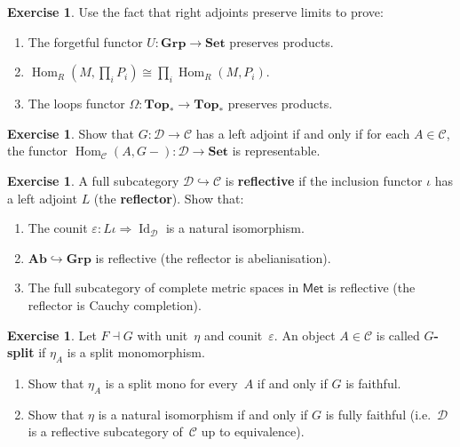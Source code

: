 \documentclass[a4paper,12pt]{book}
\DeclareMathOperator{\Hom}{Hom}
\DeclareMathOperator{\Id}{Id}
\newcommand{\Set}{\mathbf{Set}}
\newcommand{\Grp}{\mathbf{Grp}}
\newcommand{\Ab}{\mathbf{Ab}}
\newcommand{\Top}{\mathbf{Top}}
\theoremstyle{definition}
\newtheorem{exercise}[definition]{Exercise}
\theoremstyle{plain}
\theoremstyle{remark}
\begin{document}
\begin{exercise}\label{exer:radj-preserves-lim-examples}
Use the fact that right adjoints preserve limits to prove:
\begin{enumerate}[label=(\alph*)]
\item The forgetful functor $U\colon\Grp\to\Set$ preserves products.
\item $\Hom_R(M,\prod_i P_i)\cong\prod_i\Hom_R(M,P_i)$.
\item The loops functor $\Omega\colon\Top_*\to\Top_*$ preserves products.
\end{enumerate}
\end{exercise}

\begin{exercise}\label{exer:adj-iff-representable}
Show that $G\colon\mathcal{D}\to\mathcal{C}$ has a left adjoint
if and only if for each $A\in\mathcal{C}$, the functor
$\Hom_\mathcal{C}(A,G-)\colon\mathcal{D}\to\Set$ is representable.
\end{exercise}

\begin{exercise}\label{exer:reflective-subcategory}
A full subcategory $\mathcal{D}\hookrightarrow\mathcal{C}$ is
\textbf{reflective} if the inclusion functor $\iota$ has a left adjoint
$L$ (the \textbf{reflector}).  Show that:
\begin{enumerate}[label=(\alph*)]
\item The counit $\varepsilon\colon L\iota\Rightarrow\Id_\mathcal{D}$
    is a natural isomorphism.
\item $\Ab\hookrightarrow\Grp$ is reflective (the reflector is abelianisation).
\item The full subcategory of complete metric spaces in $\mathsf{Met}$
    is reflective (the reflector is Cauchy completion).
\end{enumerate}
\end{exercise}

\begin{exercise}\label{exer:fixed-points-adjunction}
Let $F\dashv G$ with unit~$\eta$ and counit~$\varepsilon$.
An object $A\in\mathcal{C}$ is called \textbf{$G$-split} if
$\eta_A$ is a split monomorphism.
\begin{enumerate}[label=(\alph*)]
\item Show that $\eta_A$ is a split mono for every~$A$ if and only if
    $G$ is faithful.
\item Show that $\eta$ is a natural isomorphism if and only if
    $G$ is fully faithful (i.e.\ $\mathcal{D}$ is a reflective
    subcategory of~$\mathcal{C}$ up to equivalence).
\end{enumerate}
\end{exercise}
\end{document}
